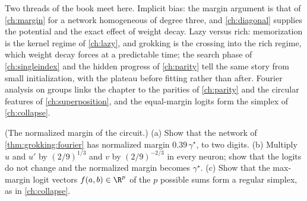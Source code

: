 \begin{refsection}

Two threads of the book meet here. Implicit bias: the margin argument is that of \cref{ch:margin} for a network homogeneous of degree three, and \cref{ch:diagonal} supplies the potential and the exact effect of weight decay. Lazy versus rich: memorization is the kernel regime of \cref{ch:lazy}, and grokking is the crossing into the rich regime, which weight decay forces at a predictable time; the search phase of \cref{ch:singleindex} and the hidden progress of \cref{ch:parity} tell the same story from small initialization, with the plateau before fitting rather than after. Fourier analysis on groups links the chapter to the parities of \cref{ch:parity} and the circular features of \cref{ch:superposition}, and the equal-margin logits form the simplex of \cref{ch:collapse}.

\begin{exercises}
\item \consolidation (The normalized margin of the circuit.) (a) Show that the network of \cref{thm:grokking:fourier} has normalized margin $0.39\,\gamma^\star$, to two digits. (b) Multiply $u$ and $u'$ by $(2/9)^{1/3}$ and $v$ by $(2/9)^{-2/3}$ in every neuron; show that the logits do not change and the normalized margin becomes $\gamma^\star$. (c) Show that the max-margin logit vectors $f(a,b)\in\R^p$ of the $p$ possible sums form a regular simplex, as in \cref{ch:collapse}. \label{ex:grokking:normalized}


\end{exercises}
\end{refsection}
